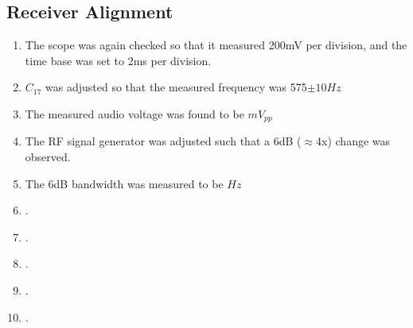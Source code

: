 \documentclass{./cls/hw}
\begin{document}
\subsection{Receiver Alignment}
\begin{enumerate}
  \item The scope was again checked so that it measured 200mV per division,
    and the time base was set to 2ms per division.
  \item $C_{17}$ was adjusted so that the measured frequency was 575$\pm 10Hz$
  \item The measured audio voltage was found to be $\boxed{ mV_{pp}}$
  \item The RF signal generator was adjusted such that a 6dB ($\approx$4x) change was observed.
  \item The 6dB bandwidth was measured to be $\boxed{ Hz}$
  \item .
  \item .
  \item .
  \item .
  \item .
\end{enumerate}
\end{document}
